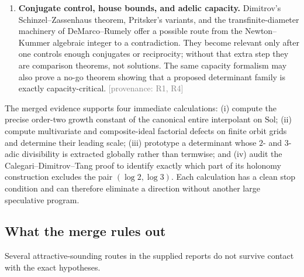 \documentclass[10pt,letterpaper]{article}
\newcommand{\Sol}{\mathrm{Sol}}
\newcommand{\Rone}{\textsf{R1}}
\newcommand{\Rfour}{\textsf{R4}}
\newcommand{\reports}[1]{\textcolor{graytext}{\footnotesize[provenance: #1]}}
\begin{document}
\begin{enumerate}
\item \textbf{Conjugate control, house bounds, and adelic capacity.}
Dimitrov's Schinzel--Zassenhaus theorem, Pritsker's variants, and the transfinite-diameter
machinery of DeMarco--Rumely offer a possible route from the Newton--Kummer algebraic integer
to a contradiction.  They become relevant only after one controls enough conjugates or
reciprocity; without that extra step they are comparison theorems, not solutions.  The same
capacity formalism may also prove a no-go theorem showing that a proposed determinant family
is exactly capacity-critical.
\reports{\Rone, \Rfour}
\end{enumerate}

\begin{takeawaybox}
The merged evidence supports four immediate calculations: (i) compute the precise
order-two growth constant of the canonical entire interpolant on \(\Sol\); (ii) compute
multivariate and composite-ideal factorial defects on finite orbit grids and determine their
leading scale; (iii) prototype a determinant whose \(2\)- and \(3\)-adic divisibility is
extracted globally rather than termwise; and (iv) audit the Calegari--Dimitrov--Tang proof to
identify exactly which part of its holonomy construction excludes the pair \((\log 2,\log 3)\).
Each calculation has a clean stop condition and can therefore eliminate a direction without
another large speculative program.
\end{takeawaybox}

\subsection{What the merge rules out}

Several attractive-sounding routes in the supplied reports do not survive contact with the
exact hypotheses.
\end{document}
